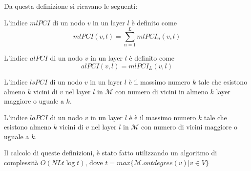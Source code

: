 Da questa definizione si ricavano le seguenti:

\begin{definizione}
    L'indice $mlPCI$ di un nodo $v$ in un layer $l$ è definito come 
    \begin{equation}
        mlPCI(v, l) = \sum_{n=1}^L mlPCI_n(v, l)
    \end{equation}
\end{definizione}

\begin{definizione}
    L'indice $alPCI$ di un nodo $v$ in un layer $l$ è definito come 
    \begin{equation}
        alPCI(v, l) = mlPCI_L(v, l)
    \end{equation}
\end{definizione}


\begin{definizione}
    L'indice $lsPCI$ di un nodo $v$ in un layer $l$ è il massimo numero $k$ 
    tale che esistono almeno $k$ vicini di $v$ nel layer $l$ in $\mathcal{M}$
    con numero di vicini in almeno $k$ layer maggiore o uguale a $k$.
\end{definizione}

\begin{definizione}
    L'indice $laPCI$ di un nodo $v$ in un layer $l$ è 
    è il massimo numero $k$ tale che esistono almeno $k$ vicini di $v$ nel layer 
    $l$ in $\mathcal{M}$
    con numero di vicini maggiore o uguale a $k$.
\end{definizione}



Il calcolo di queste definizioni, è stato fatto utilizzando un algoritmo di complessità 
$O(N L t \log{t})$, dove $t = max\{\mathcal{M}.outdegree(v) | v \in V\}$ 
